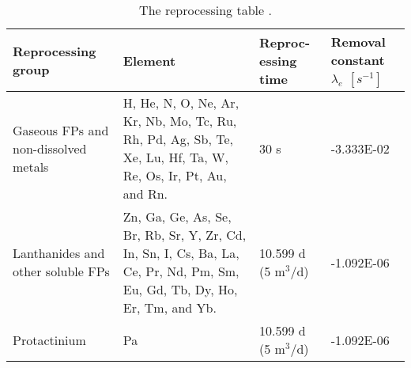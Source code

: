 \begin{table}[ht!]
	\centering
	\caption{The reprocessing table \cite{ashraf2019whole_core}.} 
	\vspace{1ex}
	\begin{tabularx}{\textwidth}{|p{2.3cm}|p{4.5cm}|s|p{2cm}|}
			\hline
			\textbf{Reprocessing group}  & \textbf{Element} & \textbf{Reproc- essing time} & \textbf{Removal constant} $\lambda_{e}$ $[s^{-1}]$ \\
			\hline
			Gaseous \gls{FPs} and non-dissolved metals  &  H, He, N, O, Ne, Ar, Kr, Nb, Mo, Tc, Ru, Rh, Pd, Ag, Sb, Te, Xe, Lu, Hf, Ta, W, Re, Os, Ir, Pt, Au, and Rn.		&	30 s	&  -3.333E-02 \\
			\hline
			Lanthanides and other soluble \gls{FPs}     & 
			Zn, Ga, Ge, As, Se, Br, Rb, Sr, Y, Zr, Cd, In, Sn, I, Cs, Ba, La, Ce, Pr, Nd, Pm, Sm, Eu, Gd, Tb, Dy, Ho, Er, Tm, and Yb. & 10.599 d (5 m$^3$/d) &  -1.092E-06 \\
			\hline
			Protactinium   & Pa  &  10.599 d (5 m$^3$/d)  &  -1.092E-06 \\
			\hline
	\end{tabularx}
	\label{tab:table6}
\end{table}


